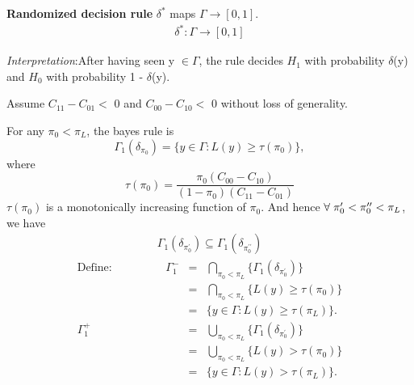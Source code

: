 \documentclass[12pt]{report}
\begin{document}
\begin{defn}
\textbf{Randomized decision rule} \nonumber  $\delta ^\ast$ maps  $\Gamma \to [0, 1]$. 
\begin{align}
 \nonumber  \delta ^\ast: \Gamma \to [0, 1]
\end{align}
\end{defn}

\noindent\textit{Interpretation}:After having seen y $\in \Gamma$, the rule decides $H_1$ with probability $\delta$(y) and $H_0$ with probability 1 - $\delta$(y).
\begin{assum}
Assume $C_{11}-C_{01} <$ 0 and $C_{00}-C_{10} <$ 0 without loss of generality.
\end{assum}
\noindent For any $\pi_0 < \pi_L$, the bayes rule is
\begin{equation}
\Gamma_1(\delta_{\pi_0}) = \{y\in\Gamma:L(y)\ge\tau (\pi_0)\}, \nonumber \end{equation}
where
\begin{equation}
 \nonumber \tau (\pi_0)=\frac{\pi_0(C_{00}-C_{10} )}{(1-\pi_0)(C_{11}-C_{01})}
\end{equation}
$\tau(\pi_0)$ is a monotonically increasing function of $\pi_0$. And hence $\forall \hspace{0.1cm} \pi_0^\prime <\pi_0^{\prime\prime}<\pi_L$, we have\\
\begin{align}
 \nonumber \Gamma_1(\delta_{\pi_0^{\prime}}) \subseteq\Gamma_1(\delta_{\pi_0^{\prime\prime}})
\end{align}
\begin{eqnarray}
 \text{Define:} \hspace{2cm} 
\nonumber \Gamma_{1}^{-} &=& \underset{\pi_0 < \pi_L}{\bigcap} \{ \Gamma_{1}(\delta_{\pi_{0}^{\prime}})\} \\\nonumber &=& \underset{\pi_0 < \pi_L}{\bigcap} \{ L(y) \geq \tau(\pi_0)\} \\ &=& \{ y \in \Gamma : L(y) \geq \tau(\pi_L) \}.  \\
\nonumber \Gamma_{1}^{+}  &=& \underset{\pi_0 < \pi_L}{\bigcup} \{ \Gamma_{1}(\delta_{\pi_{0}^{\prime}})\} \\ \nonumber &=& \underset{\pi_0 < \pi_L}{\bigcup} \{ L(y) > \tau(\pi_0)\}\\ &=& \{ y \in \Gamma : L(y) > \tau (\pi_L) \}.
\end{eqnarray}
\end{document}
